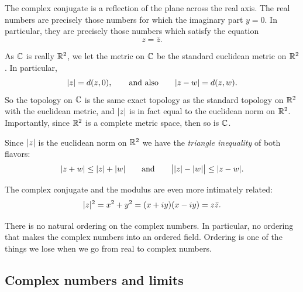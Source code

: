 The complex conjugate is a reflection of the plane across the real axis.
The real numbers are precisely those numbers for which the imaginary
part $y=0$.  In particular, they are precisely those numbers which satisfy
the equation
\begin{equation*}
z = \bar{z} .
\end{equation*}

As ${\mathbb{C}}$ is really ${\mathbb{R}}^2$, we let the metric on ${\mathbb{C}}$ be the standard
euclidean metric on ${\mathbb{R}}^2$.
In particular,
\begin{equation*}
\lvert {z} \rvert = d(z,0) , \qquad 
\text{and also} \qquad 
\lvert {z-w} \rvert = d(z,w) .
\end{equation*}
So the topology on ${\mathbb{C}}$ is
the same exact topology as the standard topology on ${\mathbb{R}}^2$
with the euclidean metric,
and $\lvert {z} \rvert$ is in fact equal to the euclidean norm on ${\mathbb{R}}^2$.
Importantly, since ${\mathbb{R}}^2$ is a complete metric space, then
so is ${\mathbb{C}}$.

Since $\lvert {z} \rvert$ is the euclidean norm on ${\mathbb{R}}^2$ we have the
\emph{triangle inequality}
of both flavors:
\begin{equation*}
\lvert {z+w} \rvert \leq \lvert {z} \rvert+\lvert {w} \rvert \qquad \text{and} \qquad
\big\lvert \lvert {z} \rvert-\lvert {w} \rvert \big\rvert \leq \lvert {z-w} \rvert .
\end{equation*}

The complex conjugate and the modulus are even more intimately related:
\begin{equation*}
\lvert {z} \rvert^2 =
x^2+y^2 =
(x+iy)(x-iy) =
z \bar{z} .
\end{equation*}

\begin{remark}
There is no natural ordering on the complex numbers.
In particular,
no ordering that makes the complex numbers into an ordered field.
Ordering is one of the things we lose when we go from real to complex
numbers.
\end{remark}

\subsection{Complex numbers and limits}

